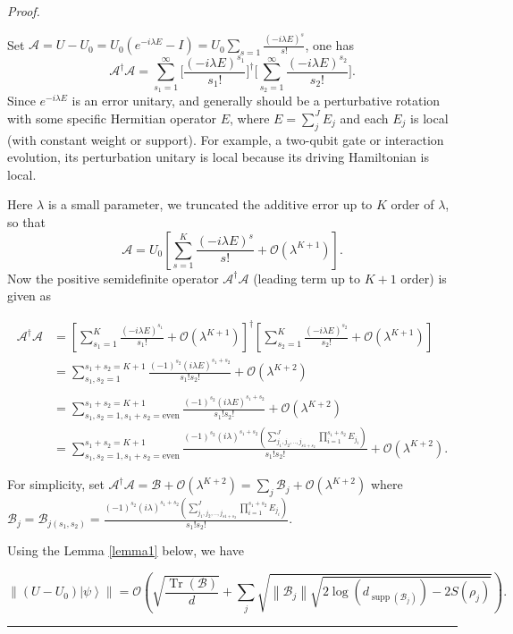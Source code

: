 \documentclass[12pt]{article}
\newenvironment{proof}{\par\noindent\textit{Proof.}}{\hfill\rule{0.6em}{0.6em}\par}
\newcommand{\autoref}[1]{\ref{#1}}
\newcommand{\ket}[1]{\left|#1\right\rangle}
\newcommand{\norm}[1]{\left\lVert #1\right\rVert}
\newcommand{\mc}{\mathcal}
\newcommand{\Tr}{\operatorname{Tr}}
\DeclareMathOperator{\support}{supp}
\begin{document}
\begin{proof}

Set
$\mathscr{A}=U-U_0=U_0(e^{-i\lambda E}-I)= U_0 {\sum_{s=1} \frac{(-i\lambda E)^s}{s!}}$,      
one has 
\begin{equation}
    \mathscr{A}^\dagger \mathscr{A}= {\sum_{s_1=1}^\infty \big[\frac{(-i\lambda E)^{s_1}}{s_1!}} \big]^\dagger  \big[{\sum_{s_2=1}^\infty  \frac{(-i\lambda E)^{s_2}}{s_2!}}\big].
\end{equation}
Since $e^{-i\lambda E}$ is an error unitary, and generally should be a perturbative rotation with some specific Hermitian operator $E$, where $E=\sum^J_j E_j$ and each $E_j$ is local (with constant weight or support). For example, a two-qubit gate or interaction evolution, its perturbation unitary is local because its driving Hamiltonian is local.  

Here $\lambda$ is a small parameter, we truncated the additive error up to $K$ order of $\lambda $, so that $$\mathscr{A}=U_0[{\sum^{K}_{s=1} \frac{(-i\lambda E)^s}{s!}}+\mc{O}(\lambda^{K+1})].$$
Now the positive semidefinite operator $\mathscr{A}^\dagger \mathscr{A}$ (leading term up to $K+1$ order) is given as

\begin{equation}
\begin{split}
    \mathscr{A}^\dagger\mathscr{A}&=[{\sum^{K}_{s_1=1} \frac{(-i\lambda E)^{s_1}}{s_1!}}+\mc{O}(\lambda^{K+1})]^\dagger [{\sum^{K}_{s_2=1} \frac{(-i\lambda E)^{s_2}}{s_2!}}+\mc{O}(\lambda^{K+1})]
    \\&=  \sum_{s_1,s_2=1}^{s_1+s_2=K+1} \frac{(-1)^{s_2}({i}\lambda E)^{s_1+s_2}}{s_1!s_2!} +\mc{O}(\lambda^{K+2})\\
     \\
    &=  \sum_{s_1,s_2=1, s_1+s_2=\text{even}}^{s_1+s_2=K+1} \frac{(-1)^{s_2}({i}\lambda E)^{s_1+s_2}}{s_1!s_2!} +\mc{O}(\lambda^{K+2})\\
    &= \sum_{s_1,s_2=1, s_1+s_2=\text{even}}^{s_1+s_2=K+1} \frac{(-1)^{s_2}({i}\lambda )^{s_1+s_2} (\sum_{j_1,j_2,..,j_{s1+s_2}}^J\prod_{i=1}^{s_1+s_2}E_{j_i})} {s_1!s_2!} +\mc{O}(\lambda^{K+2}).
    \end{split}
\end{equation}


For simplicity, set $\mathscr{A}^\dagger\mathscr{A}=\mathscr{B}+\mc{O}(\lambda^{K+2})=\sum_j \mathscr{B}_j+\mc{O}(\lambda^{K+2})$ where $\mathscr{B}_j=\mathscr{B}_{j(s_1,s_2)}=\frac{(-1)^{s_2}({i}\lambda )^{s_1+s_2} (\sum_{j_1,j_2,..,j_{s1+s_2}}^J\prod_{i=1}^{s_1+s_2}E_{j_i})} {s_1!s_2!}$.


Using the Lemma \autoref{lemma1} below, we have 


\begin{equation}
    \norm{(U-U_0)\ket{\psi}}= \mc{O}(  \sqrt{\frac{\Tr(\mathscr{B})}{d}}+\sum_j \sqrt{{\norm{\mathscr{B}_j}} \sqrt{2\log(d_{\support(\mathscr{B}_{j})})-2S(\rho_{j})}}).
\end{equation}




\end{proof}
\end{document}
